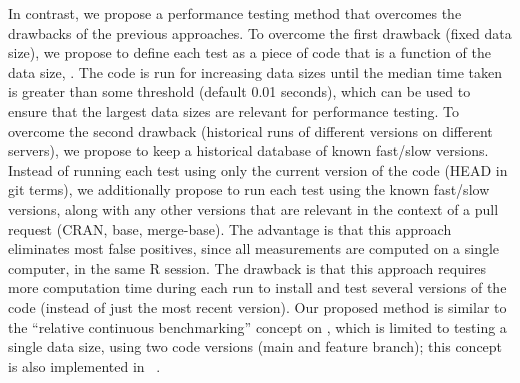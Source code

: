 In contrast, we propose a performance testing method that overcomes the drawbacks of the previous approaches.
To overcome the first drawback (fixed data size), we propose to define each test as a piece of code that is a function of the data size, . 
The code is run for increasing data sizes until the median time taken is greater than some threshold (default 0.01 seconds), which can be used to ensure that the largest data sizes are relevant for performance testing.
To overcome the second drawback (historical runs of different versions on different servers), we propose to keep a historical database of known fast/slow versions.
Instead of running each test using only the current version of the code (HEAD in git terms), we additionally propose to run each test using the known fast/slow versions, along with any other versions that are relevant in the context of a pull request (CRAN, base, merge-base).
The advantage is that this approach eliminates most false positives, since all measurements are computed on a single computer, in the same R session.
The drawback is that this approach requires more computation time during each run to install and test several versions of the code (instead of just the most recent version). 
Our proposed method is similar to the ``relative continuous benchmarking'' concept on  \citep{bencher}, which is limited to testing a single data size, using two code versions (main and feature branch); this concept is also implemented in 
~\citep{touchstone}.

